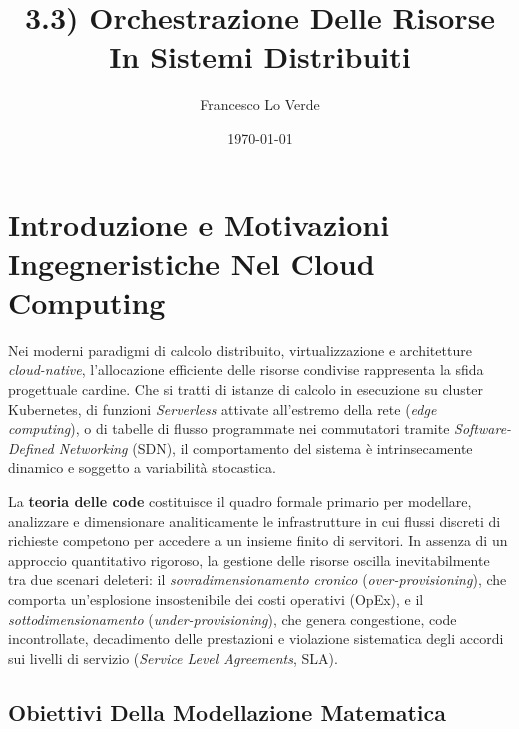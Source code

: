 \documentclass[11pt, a4paper]{article}
\title{3.3) Orchestrazione Delle Risorse In Sistemi Distribuiti}
\date{\today}
\author{Francesco Lo Verde}
\begin{document}
\maketitle



\section{Introduzione e Motivazioni Ingegneristiche Nel Cloud Computing}

Nei moderni paradigmi di calcolo distribuito, virtualizzazione e architetture \emph{cloud-native}, l'allocazione efficiente delle risorse condivise rappresenta la sfida progettuale cardine. Che si tratti di istanze di calcolo in esecuzione su cluster Kubernetes, di funzioni \emph{Serverless} attivate all'estremo della rete (\emph{edge computing}), o di tabelle di flusso programmate nei commutatori tramite \emph{Software-Defined Networking} (SDN), il comportamento del sistema è intrinsecamente dinamico e soggetto a variabilità stocastica.

La \textbf{teoria delle code} costituisce il quadro formale primario per modellare, analizzare e dimensionare analiticamente le infrastrutture in cui flussi discreti di richieste competono per accedere a un insieme finito di servitori. In assenza di un approccio quantitativo rigoroso, la gestione delle risorse oscilla inevitabilmente tra due scenari deleteri: il \emph{sovradimensionamento cronico} (\emph{over-provisioning}), che comporta un'esplosione insostenibile dei costi operativi (OpEx), e il \emph{sottodimensionamento} (\emph{under-provisioning}), che genera congestione, code incontrollate, decadimento delle prestazioni e violazione sistematica degli accordi sui livelli di servizio (\emph{Service Level Agreements}, SLA).

\subsection{Obiettivi Della Modellazione Matematica}
\end{document}
